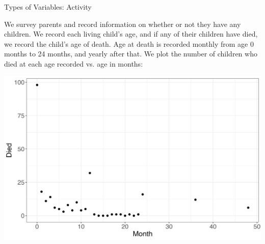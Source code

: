 \documentclass[10pt,t]{beamer}
\begin{document}
\begin{frame}{Types of Variables: Activity}

We survey parents and record information on whether or not they have any children. We record each living child's age, and if any of their children have died, we record the child's age of death. Age at death is recorded monthly from age 0 months to 24 months, and yearly after that. We plot the number of children who died at each age recorded vs. age in months:

\vspace{0.3cm}

\centering \includegraphics[scale=0.25]{u5mr.png}
\end{frame}
\end{document}
